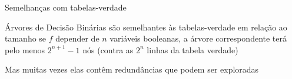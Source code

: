 \expandafter\documentclass\expandafter[table, usenames, svgnames, dvipsnames,14pt, \classopts]{beamer}
\begin{document}
\begin{frame}{Semelhanças com tabelas-verdade}

    \begin{outline}
        \1 Árvores de Decisão Binárias são semelhantes às tabelas-verdade em relação ao tamanho
            \2[-] se $f$ depender de $n$ variáveis booleanas, a árvore correspondente terá pelo menos $2^{n+1}-1$ nós (contra as $2^n$ linhas da tabela verdade)
        
        \vspace{1em}
        
        \1 Mas muitas vezes elas contêm redundâncias que podem ser exploradas
    \end{outline}      

    \begin{center}
    \end{center}
   
\end{frame}
\end{document}
